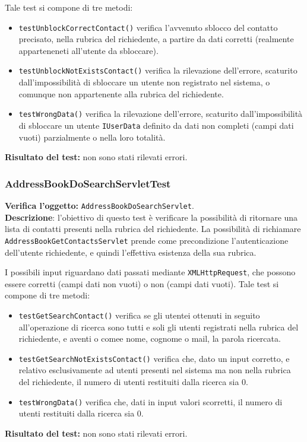 Tale test si compone di tre metodi:
\begin{itemize}
\item \texttt{testUnblockCorrectContact()} verifica l'avvenuto sblocco del contatto precisato, nella rubrica del richiedente, a partire da dati corretti (realmente apparteneneti all'utente da sbloccare).
\item \texttt{testUnblockNotExistsContact()} verifica la rilevazione dell'errore, scaturito dall'impossibilità di sbloccare un utente non registrato nel sistema, o comunque non appartenente alla rubrica del richiedente.
\item \texttt{testWrongData()} verifica la rilevazione dell'errore, scaturito dall'impossibilità di sbloccare un utente \texttt{IUserData} definito da dati non completi (campi dati vuoti) parzialmente o nella loro totalità.
\end{itemize}
\textbf{Risultato del test:} non sono stati rilevati errori.

\subsubsection{AddressBookDoSearchServletTest}
\textbf{Verifica l'oggetto:} \texttt{AddressBookDoSearchServlet}.\\
\textbf{Descrizione}: l'obiettivo di questo test è verificare la possibilità di ritornare una lista di contatti presenti nella rubrica del richiedente. La possibilità di richiamare \texttt{AddressBookGetContactsServlet} prende come precondizione l'autenticazione dell'utente richiedente, e quindi l'effettiva esistenza della sua rubrica.

I possibili input riguardano dati passati mediante \texttt{XMLHttpRequest}, che possono essere corretti (campi dati non vuoti) o non (campi dati vuoti).
Tale test si compone di tre metodi:
\begin{itemize}
\item \texttt{testGetSearchContact()} verifica se gli utentei ottenuti in seguito all'operazione di ricerca sono tutti e soli gli utenti registrati nella rubrica del richiedente, e aventi o comee nome, cognome o mail, la parola ricercata.
\item \texttt{testGetSearchNotExistsContact()} verifica che, dato un input corretto, e relativo esclusivamente ad utenti presenti nel sistema ma non nella rubrica del richiedente, il numero di utenti restituiti dalla ricerca sia 0.
\item \texttt{testWrongData()} verifica che, dati in input valori scorretti, il numero di utenti restituiti dalla ricerca sia 0.
\end{itemize}
\textbf{Risultato del test:} non sono stati rilevati errori.

